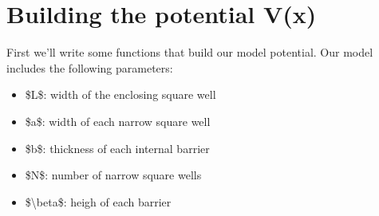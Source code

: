 \documentclass[letterpaper,10pt,english]{jupyterBook}
\begin{document}
\section{Building the potential V(x)}
\label{\detokenize{Section6_v2:building-the-potential-v-x}}
\sphinxAtStartPar
First we’ll write some functions that build our model potential. Our model includes the following parameters:
\begin{itemize}
\item {} 
\sphinxAtStartPar
\$L\$: width of the enclosing square well

\item {} 
\sphinxAtStartPar
\$a\$: width of each narrow square well

\item {} 
\sphinxAtStartPar
\$b\$: thickness of each internal barrier

\item {} 
\sphinxAtStartPar
\$N\$: number of narrow square wells

\item {} 
\sphinxAtStartPar
\$\textbackslash{}beta\$: heigh of each barrier

\end{itemize}
\end{document}
